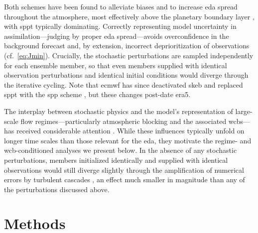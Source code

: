 Both schemes have been found to alleviate biases \parencite{bernerSystematicModelError2012, bernerStochasticParameterizationNew2017, langRevisionStochasticallyPerturbed2021} and to increase \gls{eda} spread throughout the atmosphere, most effectively above the planetary boundary layer \parencite{palmerStochasticParametrizationModel2009, isaksenEnsembleDataAssimilations2010}, with \gls{sppt} typically dominating. Correctly representing model uncertainty in assimilation---judging by proper \gls{eda} spread---avoids overconfidence in the background forecast and, by extension, incorrect deprioritization of observations (cf.~\cref{eq:Jmin}). Crucially, the stochastic perturbations are sampled independently for each ensemble member, so that even members supplied with identical observation perturbations and identical initial conditions would diverge through the iterative cycling. Note that \gls{ecmwf} has since deactivated \gls{skeb} \parencite{ecmwfIFSDocumentationCY45R12018} and replaced \gls{sppt} with the \gls{spp} scheme \parencite{ollinahoProcesslevelRepresentationModel2017, langRevisionStochasticallyPerturbed2021, ecmwfIFSDocumentationCY49R12024}, but these changes post-date \gls{era5}.

The interplay between stochastic physics and the model's representation of large-scale flow regimes---particularly atmospheric blocking and the associated \glspl{wcb}---has received considerable attention \parencite{christensenSimulatingWeatherRegimes2015, dawsonSimulatingWeatherRegimes2015, filippucciImpactStochasticPhysics2024, daviniRepresentationWinterNorthern2021, picklEffectStochasticallyPerturbed2022, wandelWhyMoistDynamic2024}. While these influences typically unfold on longer time scales than those relevant for the \gls{eda}, they motivate the regime- and \gls{wcb}-conditioned analyses we present below.
In the absence of any stochastic perturbations, members initialized identically and supplied with identical observations would still diverge slightly through the amplification of numerical errors by turbulent cascades \parencite{leithAtmosphericPredictabilityTwoDimensional1971, leutbecherEnsembleForecasting2008, langMoreAccuracyLess2021}, an effect much smaller in magnitude than any of the perturbations discussed above.

\section{Methods}\label{sec:EDA_meth}

